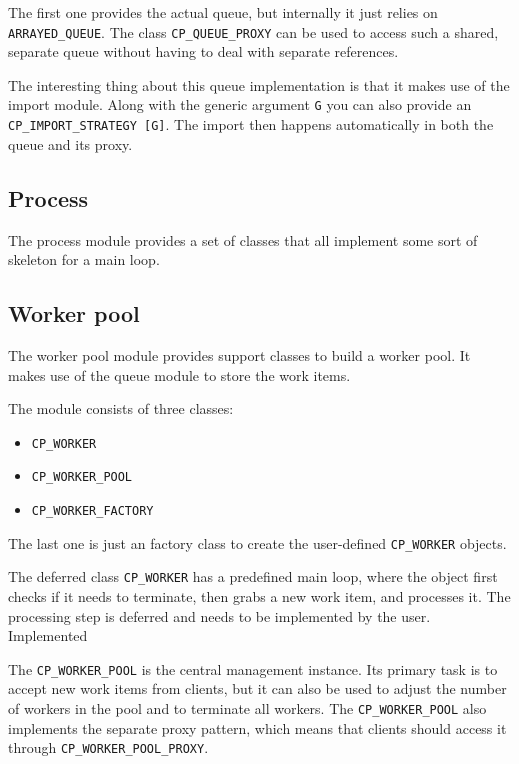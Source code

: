 \documentclass[a4paper,10pt]{report}
\begin{document}
The first one provides the actual queue, but internally it just relies on \lstinline!ARRAYED_QUEUE!.
The class \lstinline!CP_QUEUE_PROXY! can be used to access such a shared, separate queue without having to deal with separate references.

The interesting thing about this queue implementation is that it makes use of the import module.
Along with the generic argument \lstinline!G! you can also provide an \lstinline!CP_IMPORT_STRATEGY [G]!.
The import then happens automatically in both the queue and its proxy.

\subsection{Process}

The process module provides a set of classes that all implement some sort of skeleton for a main loop.


\subsection{Worker pool}

The worker pool module provides support classes to build a worker pool.
It makes use of the queue module to store the work items.

The module consists of three classes:

\begin{itemize}
 \item \lstinline!CP_WORKER!
 \item \lstinline!CP_WORKER_POOL!
 \item \lstinline!CP_WORKER_FACTORY!
\end{itemize}

The last one is just an factory class to create the user-defined \lstinline!CP_WORKER! objects.

The deferred class \lstinline!CP_WORKER! has a predefined main loop, where the object first checks if it needs to terminate, then grabs a new work item, and processes it.
The processing step is deferred and needs to be implemented by the user.
Implemented

The \lstinline!CP_WORKER_POOL! is the central management instance.
Its primary task is to accept new work items from clients, but it can also be used to adjust the number of workers in the pool and to terminate all workers.
The \lstinline!CP_WORKER_POOL! also implements the separate proxy pattern, which means that clients should access it through \lstinline!CP_WORKER_POOL_PROXY!.
\end{document}
